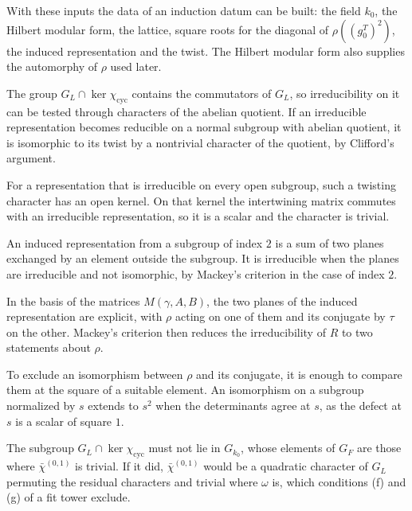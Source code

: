 With these inputs the data of an induction datum can be built: the field $k_0$, the Hilbert modular form, the lattice, square roots for the diagonal of $\rho((g_0^T)^2)$, the induced representation and the twist. The Hilbert modular form also supplies the automorphy of $\rho$ used later.

The group $G_L\cap\ker\chi_{\mathrm{cyc}}$ contains the commutators of $G_L$, so irreducibility on it can be tested through characters of the abelian quotient. If an irreducible representation becomes reducible on a normal subgroup with abelian quotient, it is isomorphic to its twist by a nontrivial character of the quotient, by Clifford's argument.

For a representation that is irreducible on every open subgroup, such a twisting character has an open kernel. On that kernel the intertwining matrix commutes with an irreducible representation, so it is a scalar and the character is trivial.

An induced representation from a subgroup of index $2$ is a sum of two planes exchanged by an element outside the subgroup. It is irreducible when the planes are irreducible and not isomorphic, by Mackey's criterion in the case of index $2$.

In the basis of the matrices $M(\gamma,A,B)$, the two planes of the induced representation are explicit, with $\rho$ acting on one of them and its conjugate by $\tau$ on the other. Mackey's criterion then reduces the irreducibility of $R$ to two statements about $\rho$.

To exclude an isomorphism between $\rho$ and its conjugate, it is enough to compare them at the square of a suitable element. An isomorphism on a subgroup normalized by $s$ extends to $s^2$ when the determinants agree at $s$, as the defect at $s$ is a scalar of square $1$.

The subgroup $G_L\cap\ker\chi_{\mathrm{cyc}}$ must not lie in $G_{k_0}$, whose elements of $G_F$ are those where $\bar\chi^{(0,1)}$ is trivial. If it did, $\bar\chi^{(0,1)}$ would be a quadratic character of $G_L$ permuting the residual characters and trivial where $\omega$ is, which conditions (f) and (g) of a fit tower exclude.

